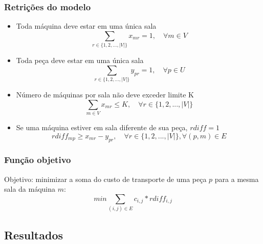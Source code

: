 \documentclass[11pt,letterpaper]{article}
\begin{document}
\subsubsection*{Retrições do modelo}
\begin{itemize}
\item Toda máquina deve estar em uma única sala
\begin{equation*}
  \sum_{r \in  \{1,2,...,|V|\}}x_{mr}=1,\quad \forall m \in V
\end{equation*}

\item Toda peça deve estar em uma única sala
\begin{equation*}
  \sum_{r \in  \{1,2,...,|V|\}}y_{pr}=1, \quad\forall p \in U
\end{equation*}

\item Número de máquinas por sala não deve exceder limite K
\begin{equation*}
  \sum_{m \in V }x_{mr}\leq K,\quad \forall r \in \{1,2,...,|V|\}
\end{equation*}

\item Se uma máquina estiver em sala diferente de sua peça, $rdiff=1$
\begin{equation*}
  rdiff_{mp}\geq x_{mr}-y_{pr},\quad \forall r \in \{1,2,...,|V|\}, \forall (p,m) \in E
\end{equation*}

\end{itemize}

\subsubsection*{Função objetivo}
Objetivo: minimizar a soma do custo de transporte de uma peça $p$ para
a mesma sala da máquina $m$:
\begin{equation}
min\sum_{(i,j) \in E}c_{i,j}*rdiff_{i,j}
\end{equation}



\subsection{Resultados}


\addtocounter{footnote}{1}
\end{document}
